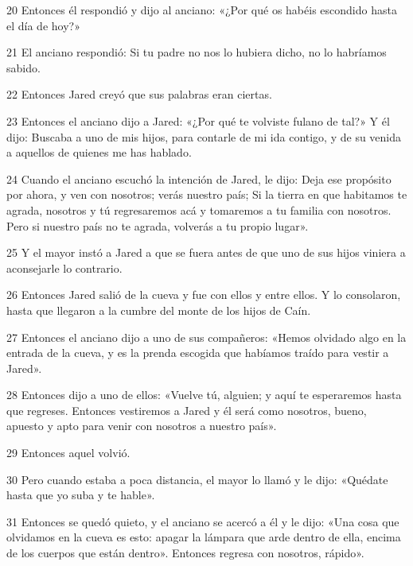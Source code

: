 \par 20 Entonces él respondió y dijo al anciano: «¿Por qué os habéis escondido hasta el día de hoy?»

\par 21 El anciano respondió: Si tu padre no nos lo hubiera dicho, no lo habríamos sabido.

\par 22 Entonces Jared creyó que sus palabras eran ciertas.

\par 23 Entonces el anciano dijo a Jared: «¿Por qué te volviste fulano de tal?» Y él dijo: Buscaba a uno de mis hijos, para contarle de mi ida contigo, y de su venida a aquellos de quienes me has hablado.

\par 24 Cuando el anciano escuchó la intención de Jared, le dijo: Deja ese propósito por ahora, y ven con nosotros; verás nuestro país; Si la tierra en que habitamos te agrada, nosotros y tú regresaremos acá y tomaremos a tu familia con nosotros. Pero si nuestro país no te agrada, volverás a tu propio lugar».

\par 25 Y el mayor instó a Jared a que se fuera antes de que uno de sus hijos viniera a aconsejarle lo contrario.

\par 26 Entonces Jared salió de la cueva y fue con ellos y entre ellos. Y lo consolaron, hasta que llegaron a la cumbre del monte de los hijos de Caín.

\par 27 Entonces el anciano dijo a uno de sus compañeros: «Hemos olvidado algo en la entrada de la cueva, y es la prenda escogida que habíamos traído para vestir a Jared».

\par 28 Entonces dijo a uno de ellos: «Vuelve tú, alguien; y aquí te esperaremos hasta que regreses. Entonces vestiremos a Jared y él será como nosotros, bueno, apuesto y apto para venir con nosotros a nuestro país».

\par 29 Entonces aquel volvió.

\par 30 Pero cuando estaba a poca distancia, el mayor lo llamó y le dijo: «Quédate hasta que yo suba y te hable».

\par 31 Entonces se quedó quieto, y el anciano se acercó a él y le dijo: «Una cosa que olvidamos en la cueva es esto: apagar la lámpara que arde dentro de ella, encima de los cuerpos que están dentro». Entonces regresa con nosotros, rápido».

